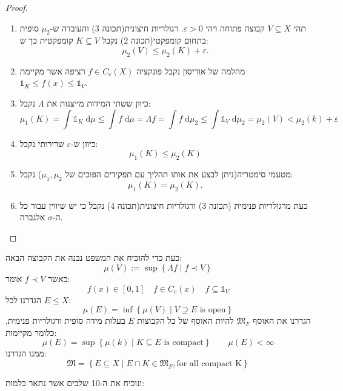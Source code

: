\documentclass{tstextbook}
\begin{document}
\begin{proof}
  \begin{enumerate}
    \item תהי \(V\subseteq X\) קבוצה פתוחה ויהי \(\varepsilon> 0\). רגולריות חיצונית(תכונה 3) והעובדה ש-\(\mu_{2}\) סופית בתחום קומפקטי(תכונה 2) נקבל \(K\subseteq V\) קומפקטית כך ש: 
$$\mu_{2}(V)\leq\mu_{2}(K)+\varepsilon.$$


    \item מהלמה של אוריסון נקבל פונקציה \(f \in C_{c}(X)\) רציפה אשר מקיימת \(\mathbb{1}_{K}\leq f(x)\leq \mathbb{1}_{V}\).  


    \item כיוון ששתי המידות מייצגות את \(\Lambda\) נקבל: 
$$\mu_{1}(K)=\int \mathbb{1} _{K} \;\mathrm{d} \mu \leq \int f \;\mathrm{d}\mu = \Lambda f=\int f \;\mathrm{d} \mu_{2}\leq \int \mathbb{1} _{V} \;\mathrm{d} \mu_{2} = \mu_{2}(V)<\mu_{2}(k)+\varepsilon    $$


    \item כיוון ש-\(\varepsilon\) שרירותי נקבל: 
$$\mu_{1}(K)\leq\mu_{2}(K)$$


    \item מטעמי סימטריה(ניתן לבצע את אותו תהליך עם תפקידים הפוכים של \(\mu_{1},\mu_{2}\)) נקבל: 
$$\mu_{1}(K)=\mu_{2}(K).$$


    \item כעת מרגולריות פנימית (תכונה 3) ורגולריות חיצונית(תכונה 4) נקבל כי יש שיווין עבור כל ה-\(\sigma\) אלגברה. 


  \end{enumerate}
\end{proof}
כעת כדי להוכיח את המשפט נבנה את הקבוצה הבאה:
$$\mu(V):= \sup \left\{  \Lambda f\mid f\prec V  \right\}$$
כאשר \(f\prec V\)  אומר:
$$f(x) \in [0,1]\quad f \in C_{c}(x)\quad f \subseteq \mathbb{1} _{V}$$
הגדרנו לכל \(E \leq X\):
$$\mu(E)=\inf \left\{   \mu(V)\mid V\supseteq E \text{ is open}    \right\}$$
הגדרנו את האוסף \(\mathfrak{M}_{F}\) להיות האוסף של כל הקבוצות \(E\) בעלות מידה סופית ורגולריות פנימית, כלומר מקיימות:
$$\mu(E)=\sup \left\{  \mu(k)\mid K \subseteq E \text{ is compact}  \right\}\qquad \mu(E)<\infty$$
ממנו הגדרנו:
$$\mathfrak{M} =\left\{  E\subseteq X \mid E\cap K \in \mathfrak{M} _{F}, \text{for all compact K}  \right\}$$

ונוכיח את ה-10 שלבים אשר נתאר כלמות:
\end{document}
